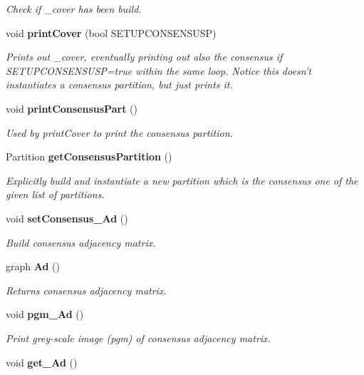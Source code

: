 \begin{CompactItemize}
\begin{CompactList}\small\item\em Check if \_\-cover has been build. \item\end{CompactList}\item 
void {\bf print\-Cover} (bool SETUPCONSENSUSP)
\begin{CompactList}\small\item\em Prints out \_\-cover, eventually printing out also the consensus if SETUPCONSENSUSP=true within the same loop. Notice this doesn't instantiates a consensus partition, but just prints it. \item\end{CompactList}\item 
void {\bf print\-Consensus\-Part} ()\label{classPartitionStats_a11}

\begin{CompactList}\small\item\em Used by print\-Cover to print the consensus partition. \item\end{CompactList}\item 
Partition {\bf get\-Consensus\-Partition} ()
\begin{CompactList}\small\item\em Explicitly build and instantiate a new partition which is the consensus one of the given list of partitions. \item\end{CompactList}\item 
void {\bf set\-Consensus\_\-Ad} ()\label{classPartitionStats_a13}

\begin{CompactList}\small\item\em Build consensus adjacency matrix. \item\end{CompactList}\item 
graph {\bf Ad} ()\label{classPartitionStats_a14}

\begin{CompactList}\small\item\em Returns consensus adjacency matrix. \item\end{CompactList}\item 
void {\bf pgm\_\-Ad} ()\label{classPartitionStats_a15}

\begin{CompactList}\small\item\em Print grey-scale image (pgm) of consensus adjacency matrix. \item\end{CompactList}\item 
void {\bf get\_\-Ad} ()\label{classPartitionStats_a16}


\end{CompactItemize}
